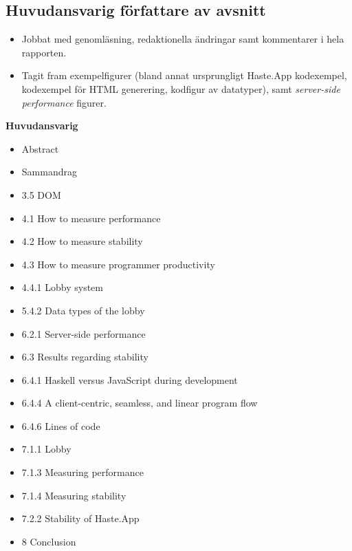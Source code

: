 \subsection{Huvudansvarig författare av avsnitt}
\begin{itemize}
  \item Jobbat med genomläsning, redaktionella ändringar samt kommentarer i hela rapporten.
  \item Tagit fram exempelfigurer (bland annat ursprungligt Haste.App kodexempel, kodexempel för HTML generering, kodfigur av datatyper), samt \textit{server-side performance} figurer.
\end{itemize}

\textbf{Huvudansvarig}
\begin{itemize}
    \item Abstract
    \item Sammandrag
    \item 3.5 DOM
    \item 4.1 How to measure performance
    \item 4.2 How to measure stability
    \item 4.3 How to measure programmer productivity
    \item 4.4.1 Lobby system
    \item 5.4.2 Data types of the lobby
    \item 6.2.1 Server-side performance
    \item 6.3 Results regarding stability
    \item 6.4.1 Haskell versus JavaScript during development
    \item 6.4.4 A client-centric, seamless, and linear program flow
    \item 6.4.6 Lines of code
    \item 7.1.1 Lobby
    \item 7.1.3 Measuring performance
    \item 7.1.4 Measuring stability
    \item 7.2.2 Stability of Haste.App
    \item 8 Conclusion
\end{itemize}

